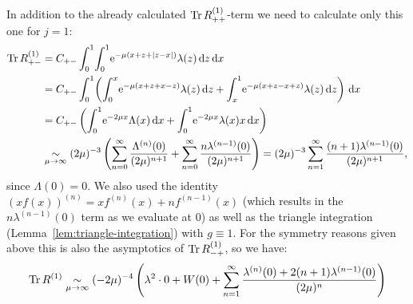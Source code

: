 In addition to the already calculated $\operatorname{Tr} R^{(1)}_{++}$-term we need to
calculate only this one for $j=1$:
\begin{align*}
  \Tr R^{(1)}_{+-} &= C_{+-} \Int{x}{
      \Int{z}{
        \Eto{-\mu(x+z+\Abs{z-x})}
        \lambda(z)
      }
    } \\
    &= C_{+-} \Int{x}{
      \left(
        \Integ[x]{0}{z}{
          \Eto{-\mu(x+z+x-z)}\lambda(z)
        }
      + \Integ[1]{x}{z}{
          \Eto{-\mu(x+z-x+z)} \lambda(z)
        }
      \right)
    } \\
    &= C_{+-} \left(
      \Int{x}{\Eto{-2\mu x} \Lambda(x)}
      + \Int{x}{\Eto{-2\mu x} \lambda(x)x}
      \right) \\
    &\SimAs{\mu\to\infty} %
      (2\mu)^{-3}\left(
      \Wsum{\Lambda^{(n)}} + \Wsum{n\lambda^{(n-1)}}\right)
      = (2\mu)^{-3} \Wsum[1]{(n+1)\lambda^{(n-1)}},
\end{align*}
since $\Lambda(0) = 0$. We also used the identity $(xf(x))^{(n)} = xf^{(n)}(x) +
nf^{(n-1)}(x)$ (which results in the $n\lambda^{(n-1)}(0)$ term as we evaluate
at $0$) as well as the triangle integration
(Lemma~\ref{lem:triangle-integration}) with $g \equiv 1$.
For the symmetry reasons given above this is also the asymptotics of $\operatorname{Tr}
R^{(1)}_{-+}$, so we have:
\begin{align}
  \label{eqn:tr1}
  \operatorname{Tr} R^{(1)} \mathrel{\underset{\mu\to\infty}{\sim}} (-2\mu)^{-4}
  \left(
    \lambda^2\cdot 0 + W(0) + \sum_{n=1}^\infty \frac{
      \lambda^{(n)}(0) + 2(n+1)\lambda^{(n-1)}(0)
    }{(2\mu)^n}
  \right)
\end{align}

